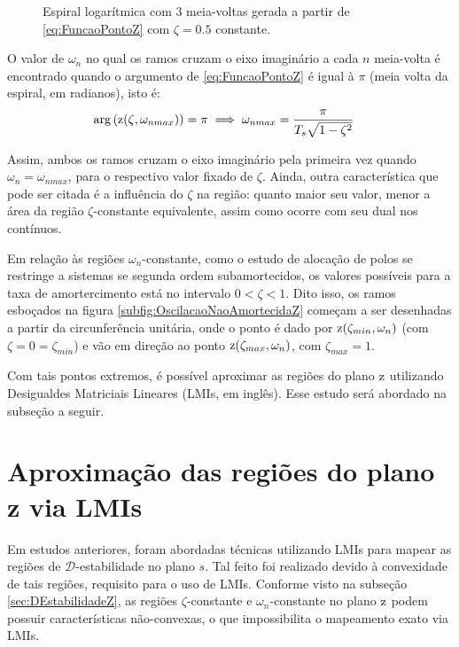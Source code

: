 \begin{figure}[!ht]
  \centering
  
  \caption{Espiral logarítmica com 3 meia-voltas gerada a partir de \eqref{eq:FuncaoPontoZ} com $\zeta=0.5$ constante.}
  \label{fig:EspiralLogaritmica}
\end{figure}

O valor de $\omega_n$ no qual os ramos cruzam o eixo imaginário a cada $n$ meia-volta é encontrado quando o argumento de \eqref{eq:FuncaoPontoZ} é igual à $\pi$ (meia volta da espiral, em radianos), isto é:
\begin{align}
  \arg{\left(\operatorname{\mathrm{z}}(\zeta,\omega_{nmax})\right)} &= \pi \implies \omega_{nmax} = \dfrac{\pi}{T_s\sqrt{1-\zeta^2}}\label{eq:PontoExtremoZetaZ}
\end{align}

Assim, ambos os ramos cruzam o eixo imaginário pela primeira vez quando $\omega_n = \omega_{nmax}$, para o respectivo valor fixado de $\zeta$. Ainda, outra característica que pode ser citada é a influência do $\zeta$ na região: quanto maior seu valor, menor a área da região $\zeta$-constante equivalente, assim como ocorre com seu dual nos contínuos.

Em relação às regiões $\omega_n$-constante, como o estudo de alocação de polos se restringe a sistemas se segunda ordem subamortecidos\cite{NISE2011,OGATA2011}, os valores possíveis para a taxa de amortercimento está no intervalo $0 < \zeta < 1$. Dito isso, os ramos esboçados na figura \ref{subfig:OscilacaoNaoAmortecidaZ} começam a ser desenhadas a partir da circunferência unitária, onde o ponto é dado por $\operatorname{\mathrm{z}}(\zeta_{min},\omega_n)$ (com $\zeta = 0 = \zeta_{min}$) e vão em direção ao ponto $\operatorname{\mathrm{z}}(\zeta_{max},\omega_n)$, com $\zeta_{max} = 1$.

Com tais pontos extremos, é possível aproximar as regiões do plano $\operatorname{\mathrm{z}}$ utilizando Desigualdes Matriciais Lineares (LMIs, em inglês). Esse estudo será abordado na subseção a seguir.

\section{Aproximação das regiões do plano z via LMIs}
Em estudos anteriores, foram abordadas técnicas utilizando LMIs para mapear as regiões de $\mathscr{D}$-estabilidade no plano $s$. Tal feito foi realizado devido à convexidade de tais regiões, requisito para o uso de LMIs. Conforme visto na subseção \ref{sec:DEstabilidadeZ}, as regiões $\zeta$-constante e $\omega_n$-constante no plano $\operatorname{\mathrm{z}}$ podem possuir características não-convexas, o que impossibilita o mapeamento exato via LMIs.


